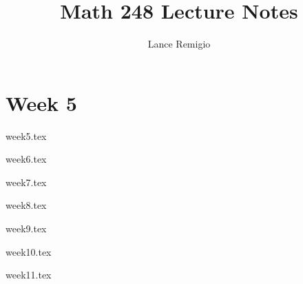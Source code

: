 \documentclass[a4paper]{article}
\title{Math 248 Lecture Notes}
\author{Lance Remigio}
\begin{document}
\maketitle
\tableofcontents

\section{Week 5}

{week5.tex}

{week6.tex}

{week7.tex}

{week8.tex}

{week9.tex}

{week10.tex}

{week11.tex}
\end{document}
